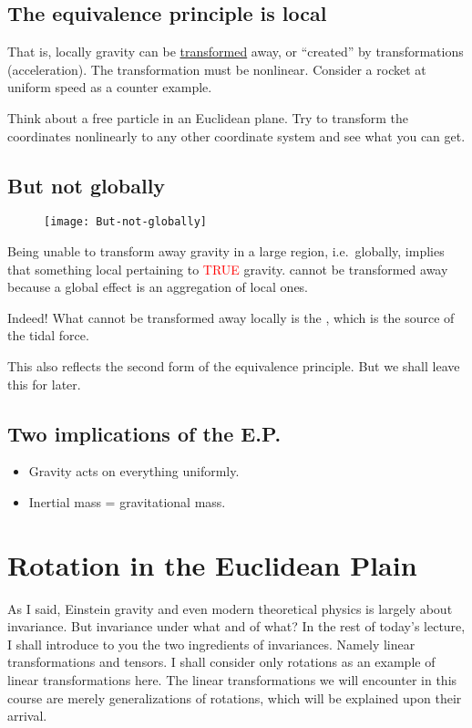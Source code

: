 \documentclass[11pt,fleqn]{book} %
\begin{document}
\subsection{The equivalence principle is local}
That is, locally gravity can be \uline{transformed} away, or ``created'' by
transformations (acceleration).
The transformation must be nonlinear.
Consider a rocket at uniform speed as a counter example.
\begin{exercise}
  Think about a free particle in an Euclidean plane. Try to transform the
  coordinates nonlinearly to any other coordinate system and see what you can get.
\end{exercise}

\subsection{But not globally}
\begin{figure}[h]
\centering\texttt{[image: But-not-globally]}
\end{figure}
Being unable to transform away gravity in a large region, i.e.\ globally, implies
that something local pertaining to \textcolor{red}{\uppercase{true}} gravity.
cannot be transformed away because a global effect is an aggregation of local ones.
\begin{emphbox}
  Indeed! What cannot be transformed away locally is the ,
  which is the source of the tidal force.
\end{emphbox}
\begin{remark}
  This also reflects the second form of the equivalence principle. But we shall
  leave this for later.
\end{remark}

\subsection{Two implications of the E.P.\ }
\begin{emphbox}
  \begin{itemize}[label={--},leftmargin=*]
  \item Gravity acts on everything uniformly.
  \item Inertial mass = gravitational mass.
  \end{itemize}
\end{emphbox}

\section{Rotation in the Euclidean Plain}
As I said, Einstein gravity and even modern theoretical physics is largely about
invariance. But invariance under what and of what? In the rest of today's
lecture, I shall introduce to you the two ingredients of invariances. Namely
linear transformations and tensors. I shall consider only rotations as an
example of linear transformations here. The linear transformations we will
encounter in this course are merely generalizations of rotations, which will be
explained upon their arrival.
\end{document}
